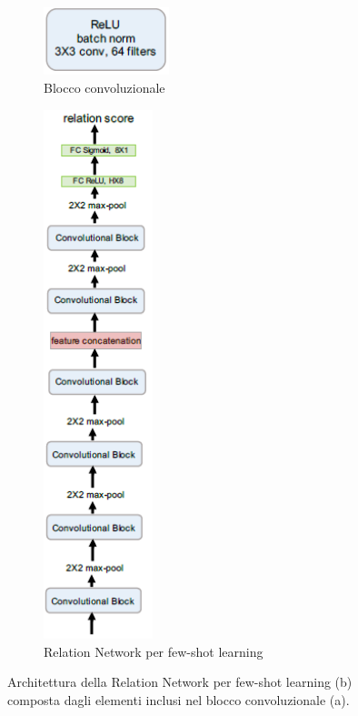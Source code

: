 \documentclass[12pt,a4paper,titlepage]{article}
\begin{document}
\begin{figure}[h]
	\centering
	\begin{subfigure}{.4\textwidth}
	 \centering
	 \includegraphics[width=0.4\textwidth]{Immagini/relation_network_conv_block}
	 \caption{Blocco convoluzionale}
	 \label{fig:relation_network_architecture_a}
	\end{subfigure}
	\qquad
	\begin{subfigure}{.4\textwidth}
    \centering
	\includegraphics[width=0.35\textwidth]{Immagini/relation_network_architecture}
	\caption{Relation Network per few-shot learning}
	\label{fig:relation_network_architecture_b}
	\end{subfigure}
	\caption{Architettura della Relation Network per few-shot learning (b) composta dagli elementi inclusi nel blocco convoluzionale (a).~\cite{sung:relation}}
	\label{fig:relation_network_architecture}	
\end{figure}
\end{document}

